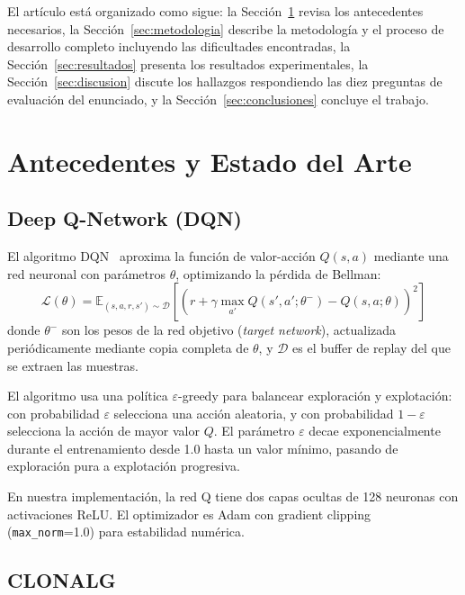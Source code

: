 \documentclass[12pt,a4paper]{article}
\begin{document}
El artículo está organizado como sigue: la Sección~\ref{sec:background}
revisa los antecedentes necesarios, la Sección~\ref{sec:metodologia}
describe la metodología y el proceso de desarrollo completo incluyendo las
dificultades encontradas, la Sección~\ref{sec:resultados} presenta los
resultados experimentales, la Sección~\ref{sec:discusion} discute los
hallazgos respondiendo las diez preguntas de evaluación del enunciado, y la
Sección~\ref{sec:conclusiones} concluye el trabajo.
 
\section{Antecedentes y Estado del Arte}
\label{sec:background}
 
\subsection{Deep Q-Network (DQN)}
 
El algoritmo DQN~\cite{mnih2015dqn} aproxima la función de valor-acción
$Q(s,a)$ mediante una red neuronal con parámetros $\theta$, optimizando la
pérdida de Bellman:
\begin{equation}
  \mathcal{L}(\theta) = \mathbb{E}_{(s,a,r,s') \sim \mathcal{D}}\!\left[
    \left(r + \gamma \max_{a'} Q(s',a';\theta^-) - Q(s,a;\theta)
    \right)^2
  \right]
  \label{eq:dqn}
\end{equation}
donde $\theta^-$ son los pesos de la red objetivo (\textit{target network}),
actualizada periódicamente mediante copia completa de $\theta$, y
$\mathcal{D}$ es el buffer de replay del que se extraen las muestras.
 
El algoritmo usa una política $\varepsilon$-greedy para balancear
exploración y explotación: con probabilidad $\varepsilon$ selecciona una
acción aleatoria, y con probabilidad $1-\varepsilon$ selecciona la acción
de mayor valor $Q$. El parámetro $\varepsilon$ decae exponencialmente
durante el entrenamiento desde 1.0 hasta un valor mínimo, pasando de
exploración pura a explotación progresiva.
 
En nuestra implementación, la red Q tiene dos capas ocultas de 128 neuronas
con activaciones ReLU. El optimizador es Adam con gradient clipping
(\texttt{max\_norm}=1.0) para estabilidad numérica.
 
\subsection{CLONALG}
 
\end{document}
